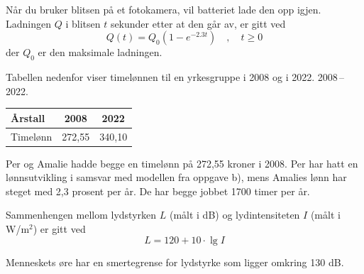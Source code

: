 Når du bruker blitsen på et fotokamera, vil batteriet lade den opp igjen.
Ladningen $Q$ i blitsen $t$ sekunder etter at den går av, er gitt ved
\[
Q(t) = Q_0\left(1 - e^{-2.3t}\right)\quad, \quad t \geq 0
\]
der $Q_0$ er den maksimale ladningen.


Tabellen nedenfor viser timelønnen til en yrkesgruppe i 2008 og i 2022.
2008\,--\,2022.
\begin{center}
	\small
	\begin{tabular}{|l|c|c|}
		\hline
		Årstall & 2008 & 2022 \\
		\hline
		Timelønn & 272,55 & 340,10 \\
		\hline
	\end{tabular}
\end{center}


Per og Amalie hadde begge en timelønn på 272,55 kroner i 2008.
Per har hatt en lønnsutvikling i samsvar med modellen fra oppgave b), mens Amalies lønn har steget med 2,3 prosent per år. De har begge jobbet 1700 timer per år.


\newpage
{}
Sammenhengen mellom lydstyrken $L$ (målt i dB) og lydintensiteten $I$
(målt i W/m$^2$) er gitt ved
\[
L = 120 + 10 \cdot \lg I
\]

Menneskets øre har en smertegrense for lydstyrke som ligger omkring 130 dB.

